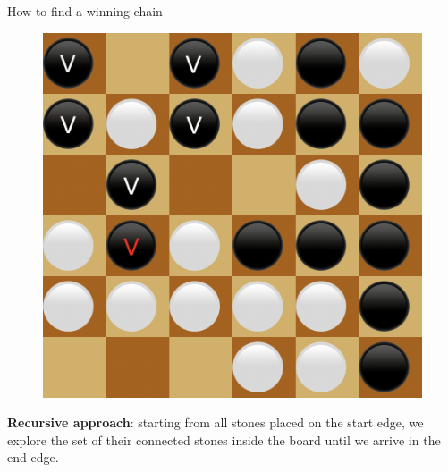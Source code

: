 \documentclass{beamer}
\begin{document}
\begin{frame}{How to find a winning chain}
{		\begin{figure}[t]
			\includegraphics[scale=0.2]{images/chain/6.png}
		\end{figure}
		
		\textbf{Recursive approach}: starting from all stones placed on the start edge, we explore the set of their connected stones inside the board until we arrive in the end edge.
	}

\end{frame}
\end{document}
